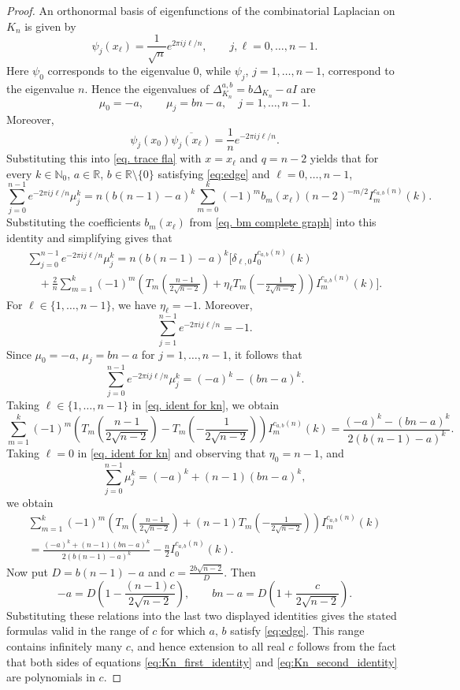 \documentclass[10pt,a4paper]{amsart}
\begin{document}
\begin{proof}
An orthonormal basis of eigenfunctions of the combinatorial Laplacian on
$K_n$ is given by
\[
\psi_j(x_\ell)=\frac1{\sqrt n}e^{2\pi i j\ell/n},
\qquad j,\ell=0,\ldots,n-1.
\]
Here $\psi_0$ corresponds to the eigenvalue $0$, while
$\psi_j$, $j=1,\ldots,n-1$, correspond to the eigenvalue $n$. Hence the
eigenvalues of $\Delta_{K_n}^{a,b}=b\Delta_{K_n}-aI$ are
\[
\mu_0=-a,\qquad
\mu_j=bn-a,\quad j=1,\ldots,n-1.
\]
Moreover,
\[
\psi_j(x_0)\overline{\psi_j(x_\ell)}
=
\frac1n e^{-2\pi i j\ell/n}.
\]
Substituting this into \eqref{eq. trace fla} with $x=x_\ell$ and $q=n-2$ yields that
for every $k\in\mathbb N_0$, $a\in\mathbb R$, $b\in\mathbb R\setminus \{0\}$ satisfying \eqref{eq:edge} and $\ell=0,\ldots,n-1$,
\[
\sum_{j=0}^{n-1}
e^{-2\pi i j\ell/n}\mu_j^k=n(b(n-1)-a)^k
\sum_{m=0}^{k}
(-1)^m
b_m(x_\ell)(n-2)^{-m/2}
I_m^{c_{a,b}(n)}(k).
\]
Substituting the coefficients $b_m(x_\ell)$ from \eqref{eq. bm complete graph}
into this identity and simplifying gives that
\begin{multline}\label{eq. ident for kn}
\sum_{j=0}^{n-1}
e^{-2\pi i j\ell/n}
\mu_j^k
=
n(b(n-1)-a)^k
\Bigg[
\delta_{\ell,0} I_0^{c_{a,b}(n)}(k) \\
\quad+
\frac{2}{n}
\sum_{m=1}^{k}
(-1)^m
\left(
T_m\!\left(\frac{n-1}{2\sqrt{n-2}}\right)
+
\eta_\ell
T_m\!\left(-\frac{1}{2\sqrt{n-2}}\right)
\right)
I_m^{c_{a,b}(n)}(k)
\Bigg].
\end{multline}
For $\ell\in\{1,\ldots,n-1\}$, we have $\eta_\ell=-1$. Moreover,
\[
\sum_{j=1}^{n-1}e^{-2\pi ij\ell/n}
=-1.
\]
Since $\mu_0=-a$, $\mu_j=bn-a$ for $j=1,\ldots,n-1$, it follows that
\[
\sum_{j=0}^{n-1}
e^{-2\pi ij\ell/n}\mu_j^k
=
(-a)^k-(bn-a)^k.
\]
Taking $\ell\in\{1,\ldots,n-1\}$ in \eqref{eq. ident for kn}, we obtain
\[
\sum_{m=1}^{k}
(-1)^m
\left(
T_m\!\left(\frac{n-1}{2\sqrt{n-2}}\right)
-
T_m\!\left(-\frac{1}{2\sqrt{n-2}}\right)
\right)
I_m^{c_{a,b}(n)}(k)
=
\frac{(-a)^k-(bn-a)^k}{2(b(n-1)-a)^k}.
\]
Taking $\ell=0$ in \eqref{eq. ident for kn} and observing that $\eta_0=n-1$, and
\[
\sum_{j=0}^{n-1}\mu_j^k
=
(-a)^k+(n-1)(bn-a)^k,
\]
we obtain
\begin{multline*}
\sum_{m=1}^{k}
(-1)^m
\left(
T_m\!\left(\frac{n-1}{2\sqrt{n-2}}\right)
+
(n-1)T_m\!\left(-\frac{1}{2\sqrt{n-2}}\right)
\right)
I_m^{c_{a,b}(n)}(k)\\
=
\frac{(-a)^k+(n-1)(bn-a)^k}{
2(b(n-1)-a)^k}
-\frac{n}{2}I_0^{c_{a,b}(n)}(k).
\end{multline*}
Now put $D=b(n-1)-a$ and $c=\frac{2b\sqrt{n-2}}{D}$. Then
\[
-a
=
D\left(1-\frac{(n-1)c}{2\sqrt{n-2}}\right),
\qquad
bn-a
=
D\left(1+\frac{c}{2\sqrt{n-2}}\right).
\]
Substituting these relations into the last two displayed identities gives the stated formulas valid in the range of $c$ for which $a,\, b$ satisfy \eqref{eq:edge}. This range contains infinitely many $c$, and hence extension to all real $c$ follows from the fact that both sides of equations \eqref{eq:Kn_first_identity} and \eqref{eq:Kn_second_identity}  are polynomials in $c$.
\end{proof}
\end{document}
